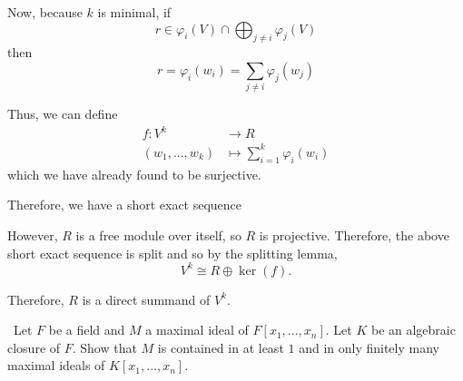 \documentclass[12pt]{Qual}
\begin{document}
\begin{solution}
\begin{enumerate}[label=(\alph*)]
   Now, because $k$ is minimal, if $$r\in \varphi_i(V)\cap\bigoplus_{j\not=i}\varphi_j(V)$$ then $$r=\varphi_i(w_i)=\sum_{j\not=i}\varphi_j(w_j)$$

   Thus, we can define \begin{align*}
       f:V^k&\to R\\
       (w_1,...,w_k)&\mapsto\sum_{i=1}^k\varphi_i(w_i)
   \end{align*}
   which we have already found to be surjective.

   Therefore, we have a short exact sequence
   \begin{center}
   \end{center}

   However, $R$ is a free module over itself, so $R$ is projective. Therefore, the above short exact sequence is split and so by the splitting lemma, $$V^k\cong R\oplus\ker(f).$$

   Therefore, $R$ is a direct summand of $V^k.$
\end{enumerate}
\end{solution}
\newpage



\begin{problem} $\,$
Let $F$ be a field and $M$ a maximal ideal of $F[x_1,...,x_n]$. Let $K$ be an algebraic closure of $F$. Show that $M$ is contained in at least $1$ and in only finitely many maximal ideals of $K[x_1,...,x_n].$
\end{problem}
\end{document}
